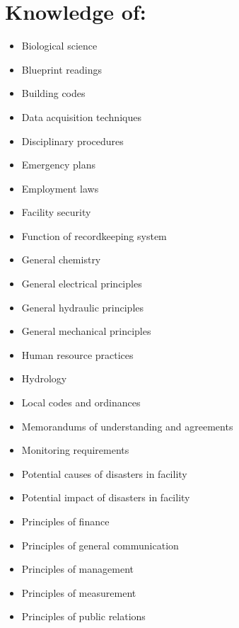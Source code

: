 \documentclass[10pt]{article}
\begin{document}
\section{Knowledge of:}
\begin{itemize}
  \item Biological science

  \item Blueprint readings

  \item Building codes

  \item Data acquisition techniques

  \item Disciplinary procedures

  \item Emergency plans

  \item Employment laws

  \item Facility security

  \item Function of recordkeeping system

  \item General chemistry

  \item General electrical principles

  \item General hydraulic principles

  \item General mechanical principles

  \item Human resource practices

  \item Hydrology

  \item Local codes and ordinances

  \item Memorandums of understanding and agreements

  \item Monitoring requirements

  \item Potential causes of disasters in facility

  \item Potential impact of disasters in facility

  \item Principles of finance

  \item Principles of general communication

  \item Principles of management

  \item Principles of measurement

  \item Principles of public relations

\end{itemize}
\end{document}

